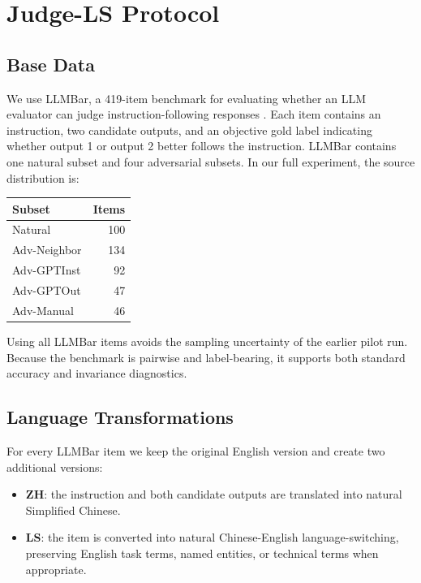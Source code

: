\documentclass[10pt,twocolumn]{article}
\begin{document}
\section{Judge-LS Protocol}

\subsection{Base Data}

We use LLMBar, a 419-item benchmark for evaluating whether an LLM evaluator can judge instruction-following responses \cite{zeng2024llmbar}. Each item contains an instruction, two candidate outputs, and an objective gold label indicating whether output 1 or output 2 better follows the instruction. LLMBar contains one natural subset and four adversarial subsets. In our full experiment, the source distribution is:

\begin{center}
\small
\begin{tabular}{lr}
\toprule
Subset & Items \\
\midrule
Natural & 100 \\
Adv-Neighbor & 134 \\
Adv-GPTInst & 92 \\
Adv-GPTOut & 47 \\
Adv-Manual & 46 \\
\bottomrule
\end{tabular}
\end{center}

Using all LLMBar items avoids the sampling uncertainty of the earlier pilot run. Because the benchmark is pairwise and label-bearing, it supports both standard accuracy and invariance diagnostics.

\subsection{Language Transformations}

For every LLMBar item we keep the original English version and create two additional versions:

\begin{itemize}
    \item \textbf{ZH}: the instruction and both candidate outputs are translated into natural Simplified Chinese.
    \item \textbf{LS}: the item is converted into natural Chinese-English language-switching, preserving English task terms, named entities, or technical terms when appropriate.
\end{itemize}
\end{document}
